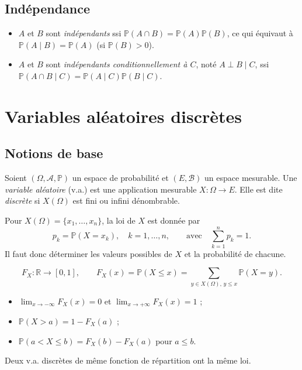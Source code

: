 \documentclass[11pt,a4paper]{article}
\renewcommand{\P}{\mathbb{P}}
\newcommand{\R}{\mathbb{R}}
\newcommand{\A}{\mathcal{A}}
\newcommand{\1}{\mathbf{1}}
\begin{document}
\subsection{Indépendance}

\begin{definition}
\begin{itemize}
  \item $A$ et $B$ sont \emph{indépendants} ssi $\P(A\cap B)=\P(A)\P(B)$, ce qui équivaut à $\P(A\mid B)=\P(A)$ (si $\P(B)>0$).
  \item $A$ et $B$ sont \emph{indépendants conditionnellement à $C$}, noté $A\perp B\mid C$, ssi $\P(A\cap B\mid C)=\P(A\mid C)\P(B\mid C)$.
\end{itemize}
\end{definition}

\section{Variables aléatoires discrètes}

\subsection{Notions de base}

\begin{definition}
Soient $(\Omega,\A,\P)$ un espace de probabilité et $(E,\mathcal{B})$ un espace mesurable. Une \emph{variable aléatoire} (v.a.) est une application mesurable $X:\Omega\to E$. Elle est dite \emph{discrète} si $X(\Omega)$ est fini ou infini dénombrable.
\end{definition}

\begin{definition}
Pour $X(\Omega)=\{x_1,\dots,x_n\}$, la loi de $X$ est donnée par
\[
p_k=\P(X=x_k),\quad k=1,\dots,n,\qquad\text{avec}\quad\sum_{k=1}^{n}p_k=1.
\]
Il faut donc déterminer les valeurs possibles de $X$ et la probabilité de chacune.
\end{definition}

\begin{definition}
\[
F_X:\R\to[0,1],\qquad F_X(x)=\P(X\le x)=\sum_{y\in X(\Omega),\,y\le x}\P(X=y).
\]
\end{definition}

\begin{proposition}[Propriétés]
\begin{itemize}
  \item $\displaystyle\lim_{x\to-\infty}F_X(x)=0$ et $\displaystyle\lim_{x\to+\infty}F_X(x)=1$ ;
  \item $\P(X>a)=1-F_X(a)$ ;
  \item $\P(a<X\le b)=F_X(b)-F_X(a)$ pour $a\le b$.
\end{itemize}
Deux v.a. discrètes de même fonction de répartition ont la même loi.
\end{proposition}
\end{document}
